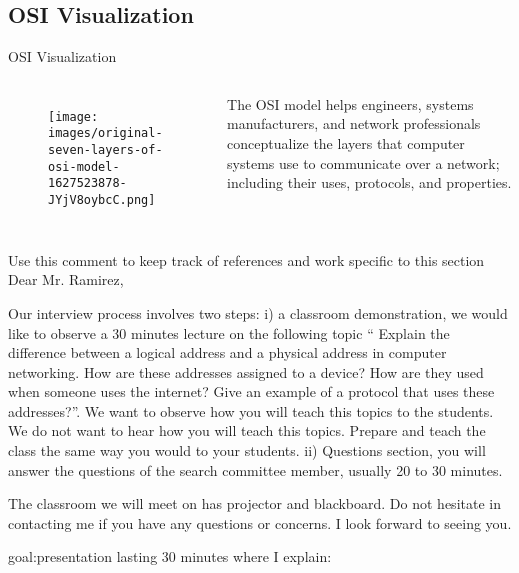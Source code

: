 \documentclass[10pt, aspectratio=43]{beamer}
\begin{document}
\subsection{OSI Visualization}
\begin{frame}{OSI Visualization}


\begin{columns}
    \begin{figure}[h] %
    \centering
    \texttt{[image: images/original-seven-layers-of-osi-model-1627523878-JYjV8oybcC.png]}
\end{figure}
\FloatBarrier
{}
\begin{block}{}
    The OSI model helps engineers, systems manufacturers, and network professionals conceptualize the layers that computer systems use to communicate over a network; including their uses, protocols, and properties.  
\end{block}


\end{columns}
\end{frame}


\iffalse 
Use this comment to keep track of references and work specific to this section
Dear Mr. Ramirez,

Our interview process involves two steps: i) a classroom demonstration, we would like to observe a 30 minutes lecture on the following topic “ Explain the difference between a logical address and a physical address in computer networking.  How are these addresses assigned to a device?   How are they used when someone uses the internet?  Give an example of a protocol that uses these addresses?”. We want to observe how you will teach this topics to the students. We do not want to hear how you will teach this topics. Prepare  and teach the class the same way  you would to your students.
ii) Questions section, you will answer the questions of the search committee member, usually 20 to 30 minutes.

The classroom we will meet on has projector and blackboard. Do not hesitate in contacting me if you have any questions or concerns. 
I look forward to seeing you.











goal:presentation lasting 30 minutes where I explain:
\end{document}
